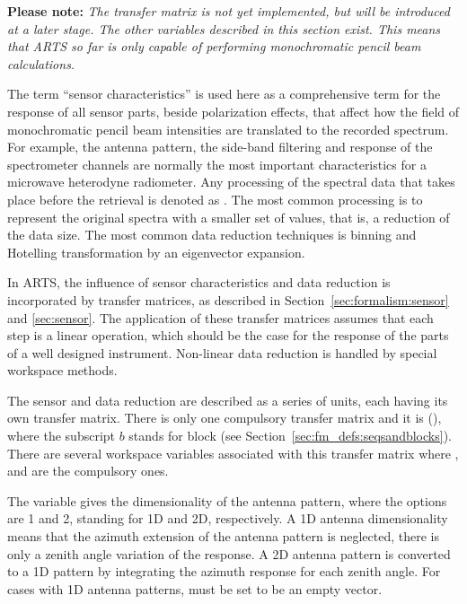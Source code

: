 {\bf Please note:} \emph{The transfer matrix  is not yet
  implemented, but will be introduced at a later stage. The other
  variables described in this section exist. This means that ARTS so
  far is only capable of performing monochromatic pencil beam
  calculations.}

The term ``sensor characteristics'' 
is used here as a
comprehensive term for the response of all sensor parts, beside
polarization effects, that affect how the field of monochromatic
pencil beam intensities are translated to the recorded spectrum. For
example, the antenna pattern, the side-band filtering and response of
the spectrometer channels are normally the most important
characteristics for a microwave heterodyne radiometer. Any processing
of the spectral data that takes place before the retrieval is denoted
as . The most common processing is to represent
the original spectra with a smaller set of values, that is, a
reduction of the data size. The most common data reduction techniques
is binning and Hotelling transformation by an eigenvector expansion.

In ARTS, the influence of sensor characteristics and data reduction is
incorporated by transfer matrices, as
described in Section~\ref{sec:formalism:sensor} and \ref{sec:sensor}.
The application of these transfer matrices assumes that each step is a
linear operation, which should be the case for the response of the
parts of a well designed instrument. Non-linear data reduction is
handled by special workspace methods.

The sensor and data reduction are described as a series of units, each
having its own transfer matrix.  There is only one compulsory transfer
matrix and it is  (), where the subscript $b$
stands for block (see Section~\ref{sec:fm_defs:seqsandblocks}). There
are several workspace variables associated with this transfer matrix
where ,  and
 are the compulsory ones.

The variable  gives the dimensionality of the
antenna pattern, where the
options are 1 and 2, standing for 1D and 2D, respectively. A 1D
antenna dimensionality means that the azimuth extension of the
antenna pattern is neglected, there is only a zenith angle variation
of the response. A 2D antenna pattern is converted to a 1D pattern by
integrating the azimuth response for each zenith angle. For cases
with 1D antenna patterns,  must be set to
be an empty vector.

